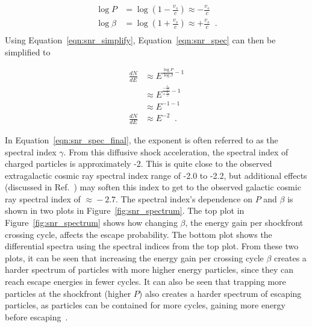   \begin{equation}\label{eqn:snr_simplify}
    \begin{split}
       \log P     & = \log \left ( 1 - \frac{v_s}{c} \right ) \approx - \frac{v_s}{c} \\
       \log \beta & = \log \left ( 1 + \frac{v_s}{c} \right ) \approx + \frac{v_s}{c} \;\; .\\
    \end{split}
  \end{equation}
  Using Equation~\ref{eqn:snr_simplify}, Equation~\ref{eqn:snr_spec} can then be simplified to
  
  \begin{equation}\label{eqn:snr_spec_final}
    \begin{split}
      \frac{dN}{dE} & \approx E^{ \frac{\log P}{\log \beta} - 1 } \\
                    & \approx E^{ \frac{ -\frac{v_s}{c} }{ +\frac{v_s}{c} } - 1 } \\
                    & \approx E^{ -1 - 1 } \\
      \frac{dN}{dE} & \approx E^{ -2 } \;\; .
    \end{split}
  \end{equation}

  In Equation~\ref{eqn:snr_spec_final}, the exponent is often referred to as the spectral index $\gamma$.
  From this diffusive shock acceleration, the spectral index of charged particles is approximately -2.
  This is quite close to the observed extragalactic cosmic ray spectral index range of -2.0 to -2.2, but additional effects (discussed in Ref.~\cite{cosmicrayspectrumorigin}) may soften this index to get to the observed galactic cosmic ray spectral index of $\approx{}-2.7$.
  The spectral index's dependence on $P$ and $\beta$ is shown in two plots in Figure~\ref{fig:snr_spectrum}.
  The top plot in Figure~\ref{fig:snr_spectrum} shows how changing $\beta$, the energy gain per shockfront crossing cycle, affects the escape probability.
  The bottom plot shows the differential spectra using the spectral indices from the top plot.
  From these two plots, it can be seen that increasing the energy gain per crossing cycle $\beta$ creates a harder spectrum of particles with more higher energy particles, since they can reach escape energies in fewer cycles.
  It can also be seen that trapping more particles at the shockfront (higher $P$) also creates a harder spectrum of escaping particles, as particles can be contained for more cycles, gaining more energy before escaping~\cite{dsa6}.

